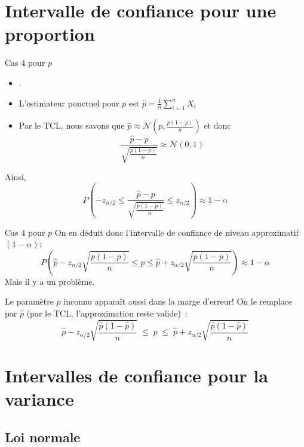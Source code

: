 \documentclass{BeamerTemplate}
\begin{document}
\section{Intervalle de confiance pour une proportion}

\begin{frame}[t]{Cas 4 pour $p$}


 \begin{itemize} \itemsep1mm
\item {\color{blue}{On suppose que $X_1,\ldots,X_n$ i.i.d. loi Bernoulli$(p)$,
où $p$ est inconnue et où $n\geq 30$}.}
\item L'estimateur ponctuel pour $p$ est $\hat{p} =\displaystyle \frac{1}{n}\sum_{i=1}^n X_i$
\item Par le TCL, nous savons que $\hat{p}\approx \mathcal{N}(p, \frac{p(1-p)}{n})$ et donc $$\frac{\hat{p}-p}{\sqrt{\frac{p(1-p)}{n}}}\approx \mathcal{N}(0,1)$$
\end{itemize}
Ainsi,
$$P\left(-z_{\alpha/2}\leq \frac{\hat{p}-p}{\sqrt{\frac{p(1-p)}{n}}} \leq z_{\alpha/2} \right)\approx 1-\alpha$$
\end{frame}
\begin{frame}[t]{Cas 4 pour $p$}
On en déduit donc l'intervalle de confiance de niveau approximatif $(1-\alpha)$:
$$P\left(\hat{p}-z_{\alpha/2}\sqrt{\frac{p(1-p)}{n}} \leq p \leq \hat{p}+z_{\alpha/2} \sqrt{\frac{p(1-p)}{n}} \right)\approx 1-\alpha$$
\pause
Mais il y a un problème.

\pause
\smallskip
{\small Le paramètre $p$ inconnu apparaît aussi dans la marge d'erreur! On le remplace par
$\hat p$ (par le TCL, l'approximation reste valide)~:
$$\hat{p}-z_{\alpha/2}\sqrt{\frac{\hat p(1-\hat p)}{n}} \;\le\; p \;\le\; \hat{p}+z_{\alpha/2} \sqrt{\frac{\hat p(1-\hat p)}{n}}$$
}
\end{frame}

\section{Intervalles de confiance pour la variance}

\subsection{Loi normale}
\end{document}
